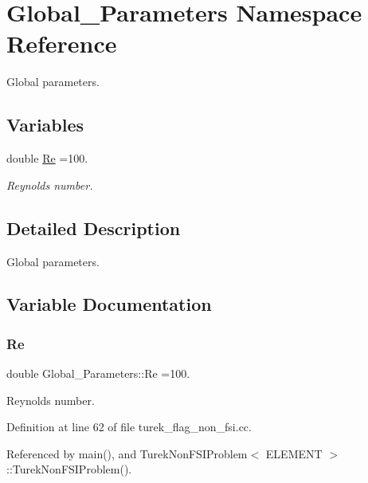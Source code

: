 \hypertarget{namespaceGlobal__Parameters}{}\section{Global\+\_\+\+Parameters Namespace Reference}
\label{namespaceGlobal__Parameters}


Global parameters.  


\subsection*{Variables}
\begin{DoxyCompactItemize}
\item 
double \hyperlink{namespaceGlobal__Parameters_a9d72e94a9305c6a310940a6a427ebe06}{Re} =100.
\begin{DoxyCompactList}\small\item\em Reynolds number. \end{DoxyCompactList}\end{DoxyCompactItemize}


\subsection{Detailed Description}
Global parameters. 

\subsection{Variable Documentation}
\mbox{\label{namespaceGlobal__Parameters_a9d72e94a9305c6a310940a6a427ebe06}} 
\subsubsection{\texorpdfstring{Re}{Re}}
{\footnotesize\ttfamily double Global\+\_\+\+Parameters\+::\+Re =100.}



Reynolds number. 



Definition at line 62 of file turek\+\_\+flag\+\_\+non\+\_\+fsi.\+cc.



Referenced by main(), and Turek\+Non\+F\+S\+I\+Problem$<$ E\+L\+E\+M\+E\+N\+T $>$\+::\+Turek\+Non\+F\+S\+I\+Problem().

